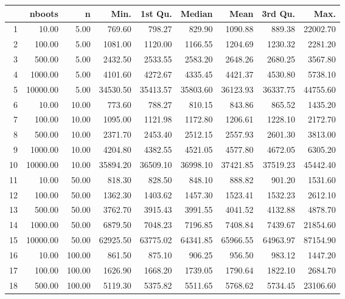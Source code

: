 \begin{table}[ht]
\centering
\begin{tabular}{rrrrrrrrr}
  \hline
 & nboots & n & Min. & 1st Qu. & Median & Mean & 3rd Qu. & Max. \\ 
  \hline
1 & 10.00 & 5.00 & 769.60 & 798.27 & 829.90 & 1090.88 & 889.38 & 22002.70 \\ 
  2 & 100.00 & 5.00 & 1081.00 & 1120.00 & 1166.55 & 1204.69 & 1230.32 & 2281.20 \\ 
  3 & 500.00 & 5.00 & 2432.50 & 2533.55 & 2583.20 & 2648.26 & 2680.25 & 3567.80 \\ 
  4 & 1000.00 & 5.00 & 4101.60 & 4272.67 & 4335.45 & 4421.37 & 4530.80 & 5738.10 \\ 
  5 & 10000.00 & 5.00 & 34530.50 & 35413.57 & 35803.60 & 36123.93 & 36337.75 & 44755.60 \\ 
  6 & 10.00 & 10.00 & 773.60 & 788.27 & 810.15 & 843.86 & 865.52 & 1435.20 \\ 
  7 & 100.00 & 10.00 & 1095.00 & 1121.98 & 1172.80 & 1206.61 & 1228.10 & 2172.70 \\ 
  8 & 500.00 & 10.00 & 2371.70 & 2453.40 & 2512.15 & 2557.93 & 2601.30 & 3813.00 \\ 
  9 & 1000.00 & 10.00 & 4204.80 & 4382.55 & 4521.05 & 4577.80 & 4672.05 & 6305.20 \\ 
  10 & 10000.00 & 10.00 & 35894.20 & 36509.10 & 36998.10 & 37421.85 & 37519.23 & 45442.40 \\ 
  11 & 10.00 & 50.00 & 818.30 & 828.50 & 848.10 & 888.82 & 901.20 & 1531.60 \\ 
  12 & 100.00 & 50.00 & 1362.30 & 1403.62 & 1457.30 & 1523.41 & 1532.23 & 2612.10 \\ 
  13 & 500.00 & 50.00 & 3762.70 & 3915.43 & 3991.55 & 4041.52 & 4132.88 & 4878.70 \\ 
  14 & 1000.00 & 50.00 & 6879.50 & 7048.23 & 7196.85 & 7408.84 & 7439.67 & 21854.60 \\ 
  15 & 10000.00 & 50.00 & 62925.50 & 63775.02 & 64341.85 & 65966.55 & 64963.97 & 87154.90 \\ 
  16 & 10.00 & 100.00 & 861.50 & 875.10 & 906.25 & 956.50 & 983.12 & 1447.20 \\ 
  17 & 100.00 & 100.00 & 1626.90 & 1668.20 & 1739.05 & 1790.64 & 1822.10 & 2684.70 \\ 
  18 & 500.00 & 100.00 & 5119.30 & 5375.82 & 5511.65 & 5768.62 & 5734.45 & 23106.60 \\ 

\end{tabular}
\end{table}
